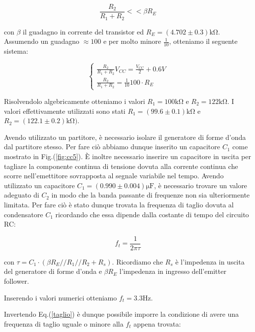 \begin{equation}
\frac{R_2}{R_1+R_2} <<\beta R_E
\label{partitore2}
\end{equation}

con $\beta$ il guadagno in corrente del transistor ed $R_E=(4.702\pm0.3)\si{\kilo\ohm}$. Assumendo un guadagno $\approx 100$ e per molto minore $\frac{1}{10}$, otteniamo il seguente sistema:

\begin{equation}
\begin{cases}
\frac{R_2}{R_1+R_2} V_{CC}=\frac{V_{CC}}{2} + 0.6V\\
\frac{R_2}{R_1+R_2} =\frac{1}{10} 100 \cdot R_E
\end{cases}
\end{equation}


Risolvendolo algebricamente otteniamo i valori $R_1=100\si{\kilo\ohm}$ e $R_2=122\si{\kilo\ohm}$. I valori effettivamente utilizzati sono stati $R_1=(99.6\pm0.1)\si{\kilo\ohm}$ e $R_2=(122.1\pm0.2) \si{\kilo\ohm})$.

Avendo utilizzato un partitore, è necessario isolare il generatore di forme d'onda dal partitore stesso. Per fare ciò abbiamo dunque inserito un capacitore $C_1$ come mostrato in Fig.(\ref{fig:cc5}).
\`E inoltre necessario inserire un capacitore in uscita per tagliare la componente continua di tensione dovuta alla corrente continua che scorre nell'emettitore sovrapposta al segnale variabile nel tempo. 
Avendo utilizzato un capacitore $C_1=(0.990\pm0.004)\si{\micro\farad}$, è necessario trovare un valore adeguato di $C_2$ in modo che la banda passante di frequenze non sia ulteriormente limitata. Per fare ciò è stato dunque trovata la frequenza di taglio dovuta al condensatore $C_1$ ricordando che essa dipende dalla costante di tempo del circuito RC:

\begin{equation}
f_t=\frac{1}{2\pi \tau} 
\label{taglio}
\end{equation}

con $\tau=C_1 \cdot (\beta R_E//R_1//R_2+R_s)$. Ricordiamo che $R_s$ è l'impedenza in uscita del generatore di forme d'onda e $\beta R_E$ l'impedenza in ingresso dell'emitter follower.

Inserendo i valori numerici otteniamo $f_t=3.3 \si{\hertz}$.


Invertendo Eq.(\ref{taglio}) è dunque possibile imporre la condizione di avere una frequenza di taglio uguale o minore alla $f_t$ appena trovata: 

